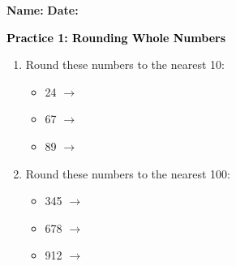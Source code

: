 \documentclass[12pt, letterpaper, fleqn]{article}
\newcommand{\blank}{\underline{\hspace{2.2cm}}}
\begin{document}
\textbf{Name:} \underline{\hspace{5cm}}
\hfill
\textbf{Date:} \underline{\hspace{3cm}}\\

\begin{tcolorbox}[colback=customteal!20]
    \large\textcolor{black}{\textbf{Practice 1: Rounding Whole Numbers}}
\end{tcolorbox}

\vspace{5mm}
\begin{enumerate}[itemsep=2.5cm, leftmargin=0.6cm]
\item Round these numbers to the nearest 10:
\begin{itemize}[itemsep=0.8cm]
  \item 24 $\rightarrow$ \blank
  \item 67 $\rightarrow$ \blank
  \item 89 $\rightarrow$ \blank
\end{itemize}

\item Round these numbers to the nearest 100:
\begin{itemize}[itemsep=0.8cm]
  \item 345 $\rightarrow$ \blank
  \item 678 $\rightarrow$ \blank
  \item 912 $\rightarrow$ \blank
\end{itemize}
\end{enumerate}
\end{document}
